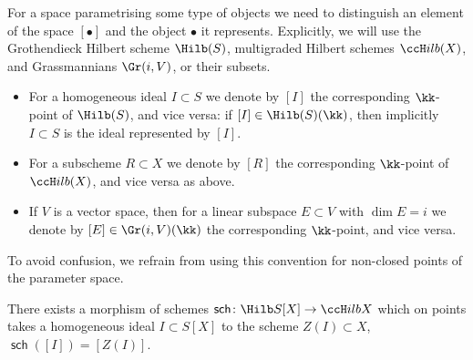 \documentclass[12pt,a4paper]{article}
\newcommand{\usualHilb}{{\ccH}ilb}
\DeclareMathOperator{\sch}{\mathsf {sch}}
\begin{document}
\begin{notation}
\label{not_parameter_spaces}
  For a space parametrising some type of objects
    we need to distinguish an element of the space $[\bullet]$ and the object $\bullet$ it represents.
  Explicitly, we will use the Grothendieck Hilbert scheme $\Hilb(S)$, multigraded Hilbert schemes $\usualHilb(X)$, and Grassmannians $\Gr(i, V)$, or their subsets.
  \begin{itemize}
   \item For a homogeneous ideal $I \subset S$
           we  denote by $[I]$ the corresponding $\kk$-point of $\Hilb(S)$, and vice versa: if $[I] \in \Hilb(S)(\kk)$, then implicitly $I\subset S$ is the ideal represented by $[I]$.
   \item For a subscheme $R \subset X$
           we  denote by $[R]$ the corresponding $\kk$-point of $\usualHilb(X)$, and vice versa as above.
   \item If $V$ is a vector space, then for a linear subspace $E \subset V$ with $\dim E =i$
           we denote by $[E]\in \Gr(i, V)(\kk)$ the corresponding $\kk$-point, and vice versa.
  \end{itemize}
  To avoid confusion, we refrain from using this convention for non-closed points of the parameter space.
\end{notation}



\begin{prop}
   There exists a morphism of schemes $\sch\colon \Hilb S[X] \to \usualHilb X$ which on points takes a homogeneous ideal $I\subset S[X]$ to the scheme $Z(I) \subset X$, $\sch([I]) = [Z(I)]$.
\end{prop}
\end{document}
